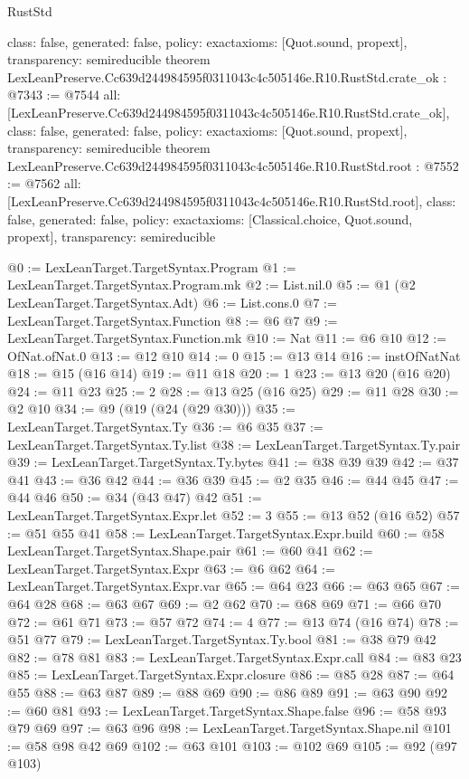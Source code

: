 \begin{lexlean}{RustStd}
\begin{coremodule}
{  class: false,
  generated: false,
  policy: exact{axioms: [Quot.sound, propext]},
  transparency: semireducible
}
theorem LexLeanPreserve.Cc639d244984595f0311043c4c505146e.R10.RustStd.crate_ok : @7343 := @7544 {
  all: [LexLeanPreserve.Cc639d244984595f0311043c4c505146e.R10.RustStd.crate_ok],
  class: false,
  generated: false,
  policy: exact{axioms: [Quot.sound, propext]},
  transparency: semireducible
}
theorem LexLeanPreserve.Cc639d244984595f0311043c4c505146e.R10.RustStd.root : @7552 := @7562 {
  all: [LexLeanPreserve.Cc639d244984595f0311043c4c505146e.R10.RustStd.root],
  class: false,
  generated: false,
  policy: exact{axioms: [Classical.choice, Quot.sound, propext]},
  transparency: semireducible
}

@0 := LexLeanTarget.TargetSyntax.Program
@1 := LexLeanTarget.TargetSyntax.Program.mk
@2 := List.nil.{0}
@5 := @1 (@2 LexLeanTarget.TargetSyntax.Adt)
@6 := List.cons.{0}
@7 := LexLeanTarget.TargetSyntax.Function
@8 := @6 @7
@9 := LexLeanTarget.TargetSyntax.Function.mk
@10 := Nat
@11 := @6 @10
@12 := OfNat.ofNat.{0}
@13 := @12 @10
@14 := 0
@15 := @13 @14
@16 := instOfNatNat
@18 := @15 (@16 @14)
@19 := @11 @18
@20 := 1
@23 := @13 @20 (@16 @20)
@24 := @11 @23
@25 := 2
@28 := @13 @25 (@16 @25)
@29 := @11 @28
@30 := @2 @10
@34 := @9 (@19 (@24 (@29 @30)))
@35 := LexLeanTarget.TargetSyntax.Ty
@36 := @6 @35
@37 := LexLeanTarget.TargetSyntax.Ty.list
@38 := LexLeanTarget.TargetSyntax.Ty.pair
@39 := LexLeanTarget.TargetSyntax.Ty.bytes
@41 := @38 @39 @39
@42 := @37 @41
@43 := @36 @42
@44 := @36 @39
@45 := @2 @35
@46 := @44 @45
@47 := @44 @46
@50 := @34 (@43 @47) @42
@51 := LexLeanTarget.TargetSyntax.Expr.let
@52 := 3
@55 := @13 @52 (@16 @52)
@57 := @51 @55 @41
@58 := LexLeanTarget.TargetSyntax.Expr.build
@60 := @58 LexLeanTarget.TargetSyntax.Shape.pair
@61 := @60 @41
@62 := LexLeanTarget.TargetSyntax.Expr
@63 := @6 @62
@64 := LexLeanTarget.TargetSyntax.Expr.var
@65 := @64 @23
@66 := @63 @65
@67 := @64 @28
@68 := @63 @67
@69 := @2 @62
@70 := @68 @69
@71 := @66 @70
@72 := @61 @71
@73 := @57 @72
@74 := 4
@77 := @13 @74 (@16 @74)
@78 := @51 @77
@79 := LexLeanTarget.TargetSyntax.Ty.bool
@81 := @38 @79 @42
@82 := @78 @81
@83 := LexLeanTarget.TargetSyntax.Expr.call
@84 := @83 @23
@85 := LexLeanTarget.TargetSyntax.Expr.closure
@86 := @85 @28
@87 := @64 @55
@88 := @63 @87
@89 := @88 @69
@90 := @86 @89
@91 := @63 @90
@92 := @60 @81
@93 := LexLeanTarget.TargetSyntax.Shape.false
@96 := @58 @93 @79 @69
@97 := @63 @96
@98 := LexLeanTarget.TargetSyntax.Shape.nil
@101 := @58 @98 @42 @69
@102 := @63 @101
@103 := @102 @69
@105 := @92 (@97 @103)

\end{coremodule}
\end{lexlean}
